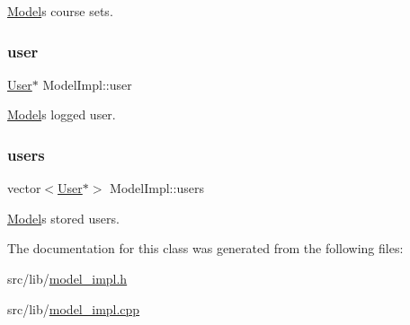 \hyperlink{classModel}{Model}\textquotesingle{}s course sets. \mbox{\label{classModelImpl_a76f8d6f7634f9395c2576a5d11628e13}} 
\subsubsection{\texorpdfstring{user}{user}}
{\footnotesize\ttfamily \hyperlink{classUser}{User}$\ast$ Model\+Impl\+::user\hspace{0.3cm}{\ttfamily [protected]}}

\hyperlink{classModel}{Model}\textquotesingle{}s logged user. \mbox{\label{classModelImpl_ae18f19dcf67479449d5e0684ed89320b}} 
\subsubsection{\texorpdfstring{users}{users}}
{\footnotesize\ttfamily vector$<$\hyperlink{classUser}{User}$\ast$$>$ Model\+Impl\+::users\hspace{0.3cm}{\ttfamily [protected]}}

\hyperlink{classModel}{Model}\textquotesingle{}s stored users. 

The documentation for this class was generated from the following files\+:\begin{DoxyCompactItemize}
\item 
src/lib/\hyperlink{model__impl_8h}{model\+\_\+impl.\+h}\item 
src/lib/\hyperlink{model__impl_8cpp}{model\+\_\+impl.\+cpp}\end{DoxyCompactItemize}
